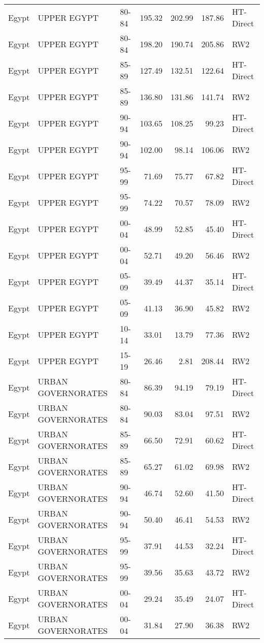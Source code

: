 \begin{longtable}{lllrrrl}
  Egypt & UPPER EGYPT & 80-84 & 195.32 & 202.99 & 187.86 & HT-Direct \\ 
  Egypt & UPPER EGYPT & 80-84 & 198.20 & 190.74 & 205.86 & RW2 \\ 
  Egypt & UPPER EGYPT & 85-89 & 127.49 & 132.51 & 122.64 & HT-Direct \\ 
  Egypt & UPPER EGYPT & 85-89 & 136.80 & 131.86 & 141.74 & RW2 \\ 
  Egypt & UPPER EGYPT & 90-94 & 103.65 & 108.25 & 99.23 & HT-Direct \\ 
  Egypt & UPPER EGYPT & 90-94 & 102.00 & 98.14 & 106.06 & RW2 \\ 
  Egypt & UPPER EGYPT & 95-99 & 71.69 & 75.77 & 67.82 & HT-Direct \\ 
  Egypt & UPPER EGYPT & 95-99 & 74.22 & 70.57 & 78.09 & RW2 \\ 
  Egypt & UPPER EGYPT & 00-04 & 48.99 & 52.85 & 45.40 & HT-Direct \\ 
  Egypt & UPPER EGYPT & 00-04 & 52.71 & 49.20 & 56.46 & RW2 \\ 
  Egypt & UPPER EGYPT & 05-09 & 39.49 & 44.37 & 35.14 & HT-Direct \\ 
  Egypt & UPPER EGYPT & 05-09 & 41.13 & 36.90 & 45.82 & RW2 \\ 
  Egypt & UPPER EGYPT & 10-14 & 33.01 & 13.79 & 77.36 & RW2 \\ 
  Egypt & UPPER EGYPT & 15-19 & 26.46 & 2.81 & 208.44 & RW2 \\ 
  Egypt & URBAN GOVERNORATES & 80-84 & 86.39 & 94.19 & 79.19 & HT-Direct \\ 
  Egypt & URBAN GOVERNORATES & 80-84 & 90.03 & 83.04 & 97.51 & RW2 \\ 
  Egypt & URBAN GOVERNORATES & 85-89 & 66.50 & 72.91 & 60.62 & HT-Direct \\ 
  Egypt & URBAN GOVERNORATES & 85-89 & 65.27 & 61.02 & 69.98 & RW2 \\ 
  Egypt & URBAN GOVERNORATES & 90-94 & 46.74 & 52.60 & 41.50 & HT-Direct \\ 
  Egypt & URBAN GOVERNORATES & 90-94 & 50.40 & 46.41 & 54.53 & RW2 \\ 
  Egypt & URBAN GOVERNORATES & 95-99 & 37.91 & 44.53 & 32.24 & HT-Direct \\ 
  Egypt & URBAN GOVERNORATES & 95-99 & 39.56 & 35.63 & 43.72 & RW2 \\ 
  Egypt & URBAN GOVERNORATES & 00-04 & 29.24 & 35.49 & 24.07 & HT-Direct \\ 
  Egypt & URBAN GOVERNORATES & 00-04 & 31.84 & 27.90 & 36.38 & RW2 \\ 

\end{longtable}
